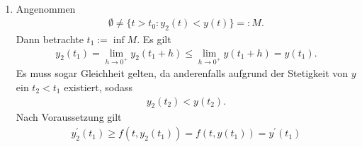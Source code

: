 \begin{solution}
\leavevmode \\
\begin{enumerate}[label = \textbf{\alph*)}]
  \item Angenommen
  \begin{align*}
    \emptyset \neq \{t > t_0: y_2(t) < y(t) \} =: M.
  \end{align*}
  Dann betrachte $t_{1} := \inf M$. Es gilt
  \begin{align*}
    y_2(t_1) = \lim_{h \to 0^+} y_2(t_1 + h) \leq \lim_{h \to 0^+} y(t_1 + h) = y(t_1).
  \end{align*}
  Es muss sogar Gleichheit gelten, da anderenfalls aufgrund der Stetigkeit von $y$
  ein $t_2 < t_1$ existiert, sodass
  \begin{align*}
    y_2(t_2) < y(t_2).
  \end{align*}
  Nach Voraussetzung gilt
  \begin{align}\label{1}
    y_2^{\prime}(t_1) \geq f(t,y_2(t_1)) = f(t,y(t_1)) = y^{\prime}(t_1)
  \end{align}


\end{enumerate}
\end{solution}
